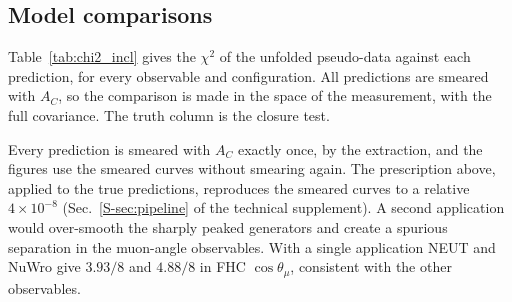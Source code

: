 \documentclass[11pt,a4paper]{article}
\newcommand{\suppref}[2]{#1~\ref{S-#2} of the technical supplement}
\begin{document}
\subsection{Model comparisons}
\label{sec:chi2}

Table~\ref{tab:chi2_incl} gives the $\chi^2$ of the unfolded pseudo-data against each prediction, for
every observable and configuration. All predictions are smeared with $A_C$, so the comparison is
made in the space of the measurement, with the full covariance. The truth column is the closure test.

Every prediction is smeared with $A_C$ exactly once, by the extraction, and the figures use the
smeared curves without smearing again. The prescription above, applied to the true predictions,
reproduces the smeared curves to a relative $4\times10^{-8}$ (\suppref{Sec.}{sec:pipeline}). A
second application would over-smooth the sharply peaked generators and create a spurious separation
in the muon-angle observables. With a single application NEUT and NuWro give $3.93/8$ and $4.88/8$ in
FHC $\cos\theta_\mu$, consistent with the other observables.
\end{document}
